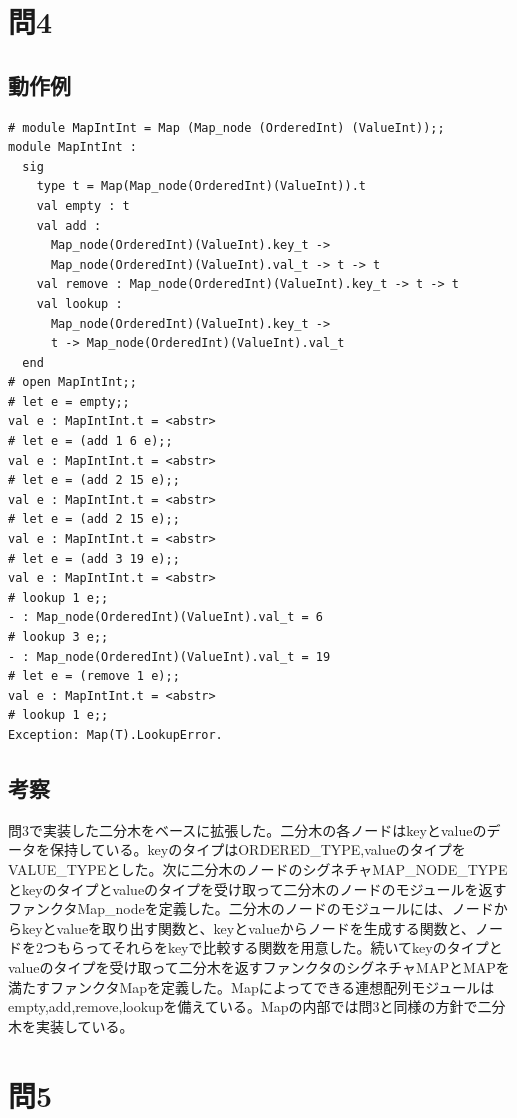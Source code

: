 \documentclass[11pt,a4paper]{jsarticle}
\begin{document}
\section*{問4}
\subsection*{動作例}
\begin{lstlisting}[basicstyle=\ttfamily\footnotesize, frame=single]
# module MapIntInt = Map (Map_node (OrderedInt) (ValueInt));;
module MapIntInt :
  sig
    type t = Map(Map_node(OrderedInt)(ValueInt)).t
    val empty : t
    val add :
      Map_node(OrderedInt)(ValueInt).key_t ->
      Map_node(OrderedInt)(ValueInt).val_t -> t -> t
    val remove : Map_node(OrderedInt)(ValueInt).key_t -> t -> t
    val lookup :
      Map_node(OrderedInt)(ValueInt).key_t ->
      t -> Map_node(OrderedInt)(ValueInt).val_t
  end
# open MapIntInt;;
# let e = empty;;
val e : MapIntInt.t = <abstr>
# let e = (add 1 6 e);;
val e : MapIntInt.t = <abstr>
# let e = (add 2 15 e);;
val e : MapIntInt.t = <abstr>
# let e = (add 2 15 e);;
val e : MapIntInt.t = <abstr>
# let e = (add 3 19 e);;
val e : MapIntInt.t = <abstr>
# lookup 1 e;;
- : Map_node(OrderedInt)(ValueInt).val_t = 6
# lookup 3 e;;
- : Map_node(OrderedInt)(ValueInt).val_t = 19
# let e = (remove 1 e);;
val e : MapIntInt.t = <abstr>
# lookup 1 e;;
Exception: Map(T).LookupError.
\end{lstlisting}
\subsection*{考察}
問3で実装した二分木をベースに拡張した。二分木の各ノードはkeyとvalueのデータを保持している。keyのタイプはORDERED\_TYPE,valueのタイプをVALUE\_TYPEとした。次に二分木のノードのシグネチャMAP\_NODE\_TYPEとkeyのタイプとvalueのタイプを受け取って二分木のノードのモジュールを返すファンクタMap\_nodeを定義した。二分木のノードのモジュールには、ノードからkeyとvalueを取り出す関数と、keyとvalueからノードを生成する関数と、ノードを2つもらってそれらをkeyで比較する関数を用意した。続いてkeyのタイプとvalueのタイプを受け取って二分木を返すファンクタのシグネチャMAPとMAPを満たすファンクタMapを定義した。Mapによってできる連想配列モジュールはempty,add,remove,lookupを備えている。Mapの内部では問3と同様の方針で二分木を実装している。
\newpage
\section*{問5}
\end{document}
